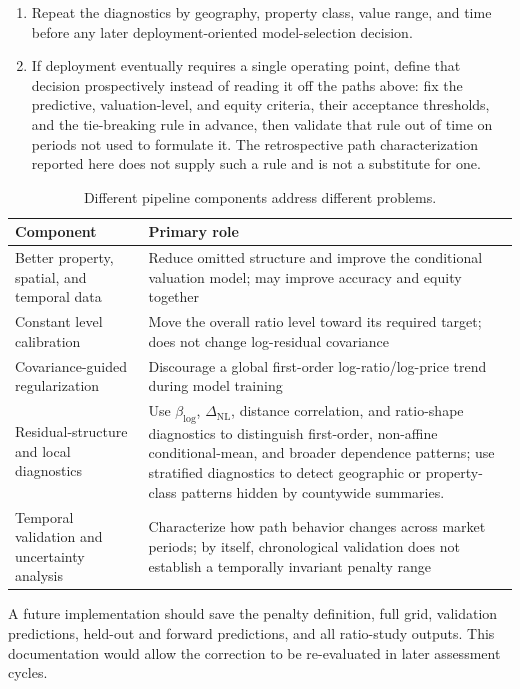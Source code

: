 \documentclass[10pt]{article}
\theoremstyle{definition}
\newcommand{\1}{\mathbf{1}}
\begin{document}
\begin{enumerate}[leftmargin=7mm]
    \item Repeat the diagnostics by geography, property class, value range, and time before any later deployment-oriented model-selection decision.
    \item If deployment eventually requires a single operating point, define that decision prospectively instead of reading it off the paths above: fix the predictive, valuation-level, and equity criteria, their acceptance thresholds, and the tie-breaking rule in advance, then validate that rule out of time on periods not used to formulate it. The retrospective path characterization reported here does not supply such a rule and is not a substitute for one.
\end{enumerate}

\begin{table}[t]
\centering
\caption{Different pipeline components address different problems.}
\label{tab:roles}
\begin{tabular}{p{4.2cm}p{10.0cm}}
\toprule
Component & Primary role \\
\midrule
Better property, spatial, and temporal data & Reduce omitted structure and improve the conditional valuation model; may improve accuracy and equity together \\
Constant level calibration & Move the overall ratio level toward its required target; does not change log-residual covariance \\
Covariance-guided regularization & Discourage a global first-order log-ratio/log-price trend during model training \\
Residual-structure and local diagnostics & Use $\beta_{\log}$, $\Delta_{\mathrm{NL}}$, distance correlation, and ratio-shape diagnostics to distinguish first-order, non-affine conditional-mean, and broader dependence patterns; use stratified diagnostics to detect geographic or property-class patterns hidden by countywide summaries. \\
Temporal validation and uncertainty analysis & Characterize how path behavior changes across market periods; by itself, chronological validation does not establish a temporally invariant penalty range \\
\bottomrule
\end{tabular}
\end{table}

A future implementation should save the penalty definition, full grid, validation predictions, held-out and forward predictions, and all ratio-study outputs. This documentation would allow the correction to be re-evaluated in later assessment cycles.
\end{document}
